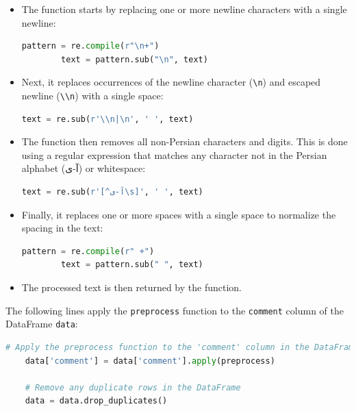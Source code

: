 \documentclass{solutionclass} %
\begin{document}
\begin{solution}
	\begin{itemize}
        \item The function starts by replacing one or more newline characters with a single newline:
        \begin{lstlisting}[language=Python]
        pattern = re.compile(r"\n+")
        text = pattern.sub("\n", text)
        \end{lstlisting}
    
        \item Next, it replaces occurrences of the newline character (\verb*|\n|) and escaped newline (\verb*|\\n|) with a single space:
        \begin{lstlisting}[language=Python]
        text = re.sub(r'\\n|\n', ' ', text)
        \end{lstlisting}
    
        \item The function then removes all non-Persian characters and digits. This is done using a regular expression that matches any character not in the Persian alphabet (آ-ی) or whitespace:
        \begin{lstlisting}[language=Python]
        text = re.sub(r'[^آ-ی\s]', ' ', text)
        \end{lstlisting}
    
        \item Finally, it replaces one or more spaces with a single space to normalize the spacing in the text:
        \begin{lstlisting}[language=Python]
        pattern = re.compile(r" +")
        text = pattern.sub(" ", text)
        \end{lstlisting}
    
        \item The processed text is then returned by the function.
    \end{itemize}
    
    The following lines apply the \texttt{preprocess} function to the \texttt{comment} column of the DataFrame \texttt{data}:
    
    \begin{lstlisting}[language=Python]
    # Apply the preprocess function to the 'comment' column in the DataFrame data
    data['comment'] = data['comment'].apply(preprocess)
    
    # Remove any duplicate rows in the DataFrame
    data = data.drop_duplicates()
    

\end{lstlisting}
\end{solution}
\end{document}
